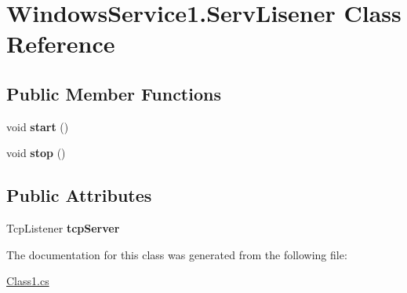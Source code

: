 \hypertarget{class_windows_service1_1_1_serv_lisener}{}\section{Windows\+Service1.\+Serv\+Lisener Class Reference}
\label{class_windows_service1_1_1_serv_lisener}
\subsection*{Public Member Functions}
\begin{DoxyCompactItemize}
\item 
\hypertarget{class_windows_service1_1_1_serv_lisener_aee4569298b222b1eb1b585a86b6d60fe}{}\label{class_windows_service1_1_1_serv_lisener_aee4569298b222b1eb1b585a86b6d60fe} 
void {\bfseries start} ()
\item 
\hypertarget{class_windows_service1_1_1_serv_lisener_a0f19c3cf63fa857170e0f49b8bd450d8}{}\label{class_windows_service1_1_1_serv_lisener_a0f19c3cf63fa857170e0f49b8bd450d8} 
void {\bfseries stop} ()
\end{DoxyCompactItemize}
\subsection*{Public Attributes}
\begin{DoxyCompactItemize}
\item 
\hypertarget{class_windows_service1_1_1_serv_lisener_abbc0fe7c48c7b0903d9cdf21efe50d4a}{}\label{class_windows_service1_1_1_serv_lisener_abbc0fe7c48c7b0903d9cdf21efe50d4a} 
Tcp\+Listener {\bfseries tcp\+Server}
\end{DoxyCompactItemize}


The documentation for this class was generated from the following file\+:\begin{DoxyCompactItemize}
\item 
\hyperlink{_class1_8cs}{Class1.\+cs}\end{DoxyCompactItemize}
